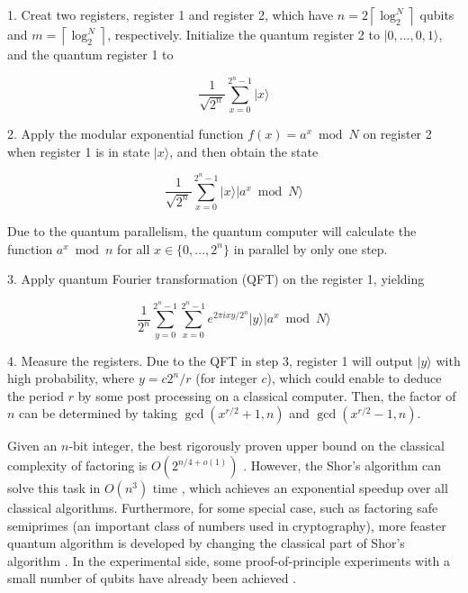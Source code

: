 \documentclass[aps,pra,singlecolumn,superscriptaddress]{revtex4-1}
\begin{document}
1. Creat two registers, register 1 and register 2, which have  $n=2\left\lceil {\log _2^N} \right\rceil$ qubits and $m=\left\lceil {\log _2^N} \right\rceil$, respectively. Initialize the quantum register 2 to $|0,...,0,1\rangle$, and the quantum register 1 to

\[\frac{1}{{\sqrt {{2^n}} }}\sum\limits_{x = 0}^{{2^n} - 1} {|x\rangle }\]


2. Apply the modular exponential function $f(x) = {a^x}\bmod N$ on register 2 when register 1 is in state $|x\rangle$, and then obtain the state

\[\frac{1}{{\sqrt {{2^n}} }}\sum\limits_{x = 0}^{{2^n} - 1} {|x\rangle|{a^x}\bmod N\rangle }\]

Due to the quantum parallelism, the quantum computer will calculate the function $a^{x} \bmod n$ for all $x \in \{ 0,...,{2^n}\}$ in parallel by only one step.

3. Apply quantum Fourier transformation (QFT) on the register 1, yielding

\[\frac{1}{{{2^n}}}\sum\limits_{y = 0}^{{2^n} - 1} {\sum\limits_{x = 0}^{{2^n} - 1} {{e^{2\pi ixy/{2^n}}}|y\rangle |{a^x}\bmod N\rangle } } \]

4. Measure the registers. Due to the QFT in step 3, register 1 will output $|y\rangle$ with high probability, where $y = c{2^n}/r$ (for integer $c$), which could enable to deduce the period $r$ by some post processing on a classical computer. Then, the factor of $n$ can be determined by taking $\gcd(x^{r/2} + 1, n)$ and  $\gcd(x^{r/2} - 1, n)$.

Given an $n$-bit integer, the best rigorously proven upper bound on the classical complexity of factoring is $O({2^{n/4 + o(1)}})$ \cite{pollard1974theorems, strassen1976einige}. However, the Shor's algorithm can solve this task in $O({n^3})$ time \cite{shor1997polynomial,shor1994algorithms}, which achieves an exponential speedup over all classical algorithms.  Furthermore, for some special case, such as factoring safe semiprimes (an important class of numbers used in cryptography), more feaster quantum algorithm is developed by changing the classical part of Shor's algorithm \cite{grosshans2015factoring}. In the experimental side, some proof-of-principle experiments with a small number of qubits have already been achieved \cite{monz2016realization, lucero2012computing, martin2012experimental, politi2009shor, lu2007demonstration, lanyon2007experimental, vandersypen2001experimental, johansson2017realization, huang2017experimental}.
\end{document}
